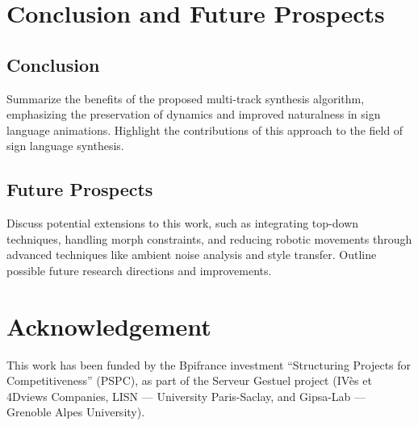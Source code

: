 \documentclass[../../main.tex]{subfiles}
\begin{document}
\section{Conclusion and Future Prospects}

\subsection{Conclusion}
Summarize the benefits of the proposed multi-track synthesis algorithm, emphasizing the preservation of dynamics and improved naturalness in sign language animations. Highlight the contributions of this approach to the field of sign language synthesis.

\subsection{Future Prospects}
Discuss potential extensions to this work, such as integrating top-down techniques, handling morph constraints, and reducing robotic movements through advanced techniques like ambient noise analysis and style transfer. Outline possible future research directions and improvements.

\section{Acknowledgement}
This work has been funded by the Bpifrance investment “Structuring Projects for Competitiveness” (PSPC), as part of the Serveur Gestuel project (IVès et 4Dviews Companies, LISN — University Paris-Saclay, and Gipsa-Lab — Grenoble Alpes University).
\end{document}
